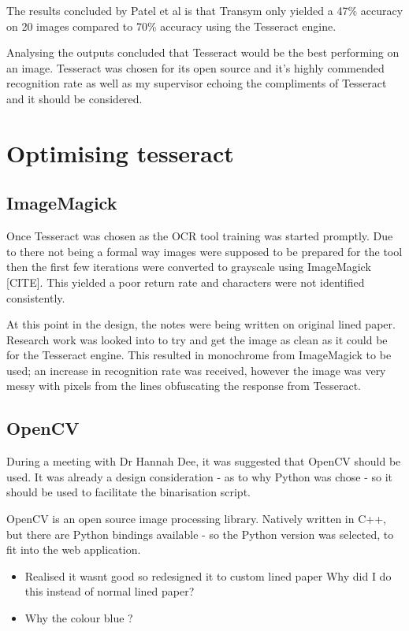 The results concluded by Patel et al is that Transym only yielded a 47\% accuracy on 20 images compared to 70\% accuracy using the Tesseract engine.

Analysing the outputs concluded that Tesseract would be the best performing on an image. Tesseract was chosen for its open source and it's highly commended recognition rate as well as my supervisor echoing the compliments of Tesseract and it should be considered.

\section{Optimising tesseract}

\subsection{ImageMagick}
Once Tesseract was chosen as the OCR tool training was started promptly. Due to there not being a formal way images were supposed to be prepared for the tool then the first few iterations were converted to grayscale using ImageMagick [CITE]. This yielded a poor return rate and characters were not identified consistently.

At this point in the design, the notes were being written on original lined paper. Research work was looked into to try and get the image as clean as it could be for the Tesseract engine. This resulted in monochrome from ImageMagick to be used; an increase in recognition rate was received, however the image was very messy with pixels from the lines obfuscating the response from Tesseract.

\subsection{OpenCV}
During a meeting with Dr Hannah Dee, it was suggested that OpenCV should be used. It was already a design consideration - as to why Python was chose - so it should be used to facilitate the binarisation script.

OpenCV is an open source image processing library. Natively written in C++, but there are Python bindings available - so the Python version was selected, to fit into the web application.





\begin{itemize}
  \item Realised it wasnt good so redesigned it to custom lined paper Why did I do this instead of normal lined paper?
  \item Why the colour blue ?
\end{itemize}
